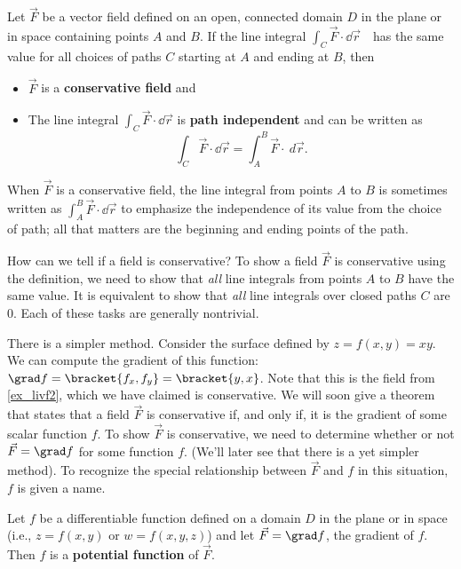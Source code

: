 \begin{definition}\label{def:conservative}%
Let $\vec F$ be a vector field defined on an open, connected domain $D$ in the plane or in space containing points $A$ and $B$. If the line integral
$\int_C \vec F\cdot\dd\vec r$\ \ has the same value for all choices of paths $C$ starting at $A$ and ending at $B$, then
\begin{itemize}
	\item $\vec F$ is a \textbf{conservative field} and
	\item	The line integral $\int_C \vec F\cdot\dd\vec r$ is \textbf{path independent} and can be written as
	\[\int_C \vec F\cdot\dd\vec r = \int_A^B \vec F\cdot \ d\vec r.\] 
\end{itemize}
\end{definition}

When $\vec F$ is a conservative field, the line integral from points $A$ to $B$ is sometimes written as $\int_A^B\vec F\cdot\dd\vec r$ to emphasize the independence of its value from the choice of path; all that matters are the beginning and ending points of the path.

How can we tell if a field is conservative? To show a field $\vec F$ is conservative using the definition, we need to show that \emph{all} line integrals from points $A$ to $B$ have the same value. It is equivalent to show that \emph{all} line integrals over closed paths $C$ are 0. Each of these tasks are generally nontrivial.

There is a simpler method. Consider the surface defined by $z = f(x,y) = xy$. We can compute the gradient of this function: $\grad f =\bracket{f_x, f_y}=\bracket{y, x}$. Note that this is the field from \autoref{ex_livf2}, which we have claimed is conservative. We will soon give a theorem that states that a field $\vec F$ is conservative if, and only if, it is the gradient of some scalar function $f$. To show $\vec F$ is conservative, we need to determine whether or not $\vec F = \grad f$ for some function $f$. (We'll later see that there is a yet simpler method). To recognize the special relationship between $\vec F$ and $f$ in this situation, $f$ is given a name.

\begin{definition}\label{def:potential}%
Let $f$ be a differentiable function defined on a  domain $D$ in the plane or in space (i.e., $z = f(x,y)$ or $w = f(x,y,z)$) and let $\vec F = \grad f$, the gradient of $f$. Then $f$ is a \textbf{potential function} of $\vec F$.
\end{definition}

